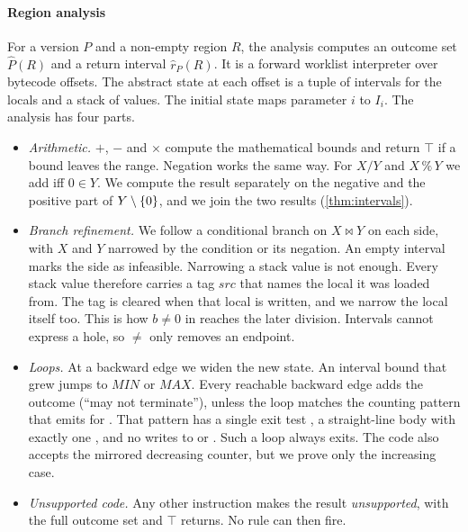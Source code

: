 \paragraph{Region analysis}
For a version $P$ and a non-empty region $R$, the analysis computes an outcome set
$\hat P(R)$ and a return interval $\hat r_P(R)$. It is a forward worklist interpreter
over bytecode offsets. The abstract state at each offset is a tuple of intervals for the
locals and a stack of values. The initial state maps parameter $i$ to $I_i$. The analysis has
four parts.
\begin{itemize}
  \item \emph{Arithmetic.} $+$, $-$ and $\times$ compute the mathematical bounds and return
        $\top$ if a bound leaves the  range. Negation works the same way. For
        $X / Y$ and $X \,\%\, Y$ we add \dbz{} iff $0 \in Y$. We compute the result
        separately on the negative and the positive part of $Y \setminus \left\{0\right\}$, and we join
        the two results (\cref{thm:intervals}).
  \item \emph{Branch refinement.} We follow a conditional branch on $X \bowtie Y$ on each
        side, with $X$ and $Y$ narrowed by the condition or its negation. An empty interval
        marks the side as infeasible. Narrowing a stack value is not enough. Every stack value
        therefore carries a tag $\mathit{src}$ that names the local it was loaded from. The
        tag is cleared when that local is written, and we narrow the local itself too. This is
        how $b \neq 0$ in  reaches the later division. Intervals
        cannot express a hole, so $\neq$ only removes an endpoint.
  \item \emph{Loops.} At a backward edge we widen the new state. An interval bound that grew
        jumps to $\mathit{MIN}$ or $\mathit{MAX}$. Every reachable backward edge adds the
        outcome \code{*} (``may not terminate''), unless the loop matches the counting pattern
        that  emits for . That pattern has a single
        exit test , a straight-line body with exactly one , and no
        writes to  or . Such a loop always exits. The code also accepts the
        mirrored decreasing counter, but we prove only the increasing case.
  \item \emph{Unsupported code.} Any other instruction makes the result \emph{unsupported},
        with the full outcome set and $\top$ returns. No rule can then fire.
\end{itemize}

